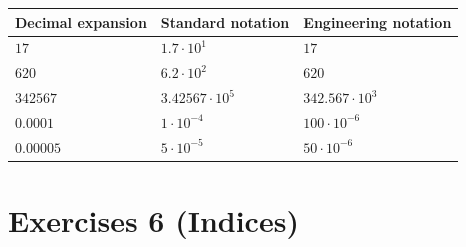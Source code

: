 \documentclass[
  english,
  12pt,
  oneside]{book}
\newcounter{none} %
\theoremstyle{definition}
\theoremstyle{definition}
\theoremstyle{definition}
\theoremstyle{definition}
\theoremstyle{remark}
\begin{document}
{\def\LTcaptype{none} %
\begin{longtable}[]{@{}
  >{\centering\arraybackslash}p{}
  >{\centering\arraybackslash}p{}
  >{\centering\arraybackslash}p{}@{}}
\toprule\noalign{}
\begin{minipage}[b]{\linewidth}\centering
Decimal expansion
\end{minipage} & \begin{minipage}[b]{\linewidth}\centering
Standard notation
\end{minipage} & \begin{minipage}[b]{\linewidth}\centering
Engineering notation
\end{minipage} \\
\midrule\noalign{}
\endhead
\bottomrule\noalign{}
\endlastfoot
\(17\) & \(1.7\cdot 10^1\) & \(17\) \\
\(620\) & \(6.2\cdot 10^2\) & \(620\) \\
\(342567\) & \(3.42567\cdot 10^5\) & \(342.567\cdot 10^3\) \\
\(0.0001\) & \(1\cdot 10^{-4}\) & \(100\cdot 10^{-6}\) \\
\(0.00005\) & \(5\cdot 10^{-5}\) & \(50\cdot 10^{-6}\) \\
\end{longtable}
}

\chapter*{Exercises 6 (Indices)}\label{exercises-6-indices}
\end{document}
